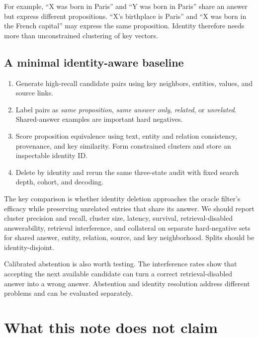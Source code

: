 \documentclass[11pt]{article}
\begin{document}
For example, ``X was born in Paris'' and ``Y was born in Paris'' share an
answer but express different propositions. ``X's birthplace is Paris'' and
``X was born in the French capital'' may express the same proposition.
Identity therefore needs more than unconstrained clustering of key vectors.

\subsection{A minimal identity-aware baseline}

\begin{enumerate}
  \item Generate high-recall candidate pairs using key neighbors, entities,
  values, and source links.
  \item Label pairs as \emph{same proposition}, \emph{same answer only},
  \emph{related}, or \emph{unrelated}. Shared-answer examples are important
  hard negatives.
  \item Score proposition equivalence using text, entity and relation
  consistency, provenance, and key similarity. Form constrained clusters and
  store an inspectable identity ID.
  \item Delete by identity and rerun the same three-state audit with fixed
  search depth, cohort, and decoding.
\end{enumerate}

The key comparison is whether identity deletion approaches the oracle
filter's efficacy while preserving unrelated entries that share its answer.
We should report cluster precision and recall, cluster size, latency,
survival, retrieval-disabled answerability, retrieval interference, and
collateral on separate hard-negative sets for shared answer, entity,
relation, source, and key neighborhood. Splits should be identity-disjoint.

Calibrated abstention is also worth testing. The interference rates show that
accepting the next available candidate can turn a correct retrieval-disabled
answer into a wrong answer. Abstention and identity resolution address
different problems and can be evaluated separately.

\section{What this note does not claim}
\end{document}
